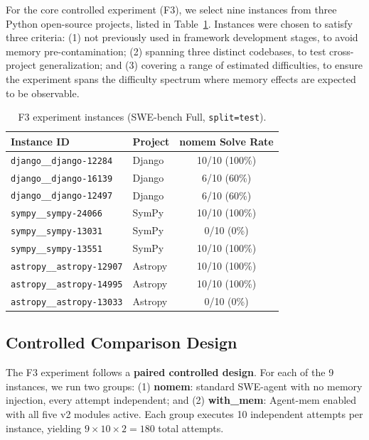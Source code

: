 \documentclass{article}
\begin{document}
For the core controlled experiment (F3), we select nine instances from three Python open-source projects, listed in Table~\ref{tab:instances}. Instances were chosen to satisfy three criteria: (1) not previously used in framework development stages, to avoid memory pre-contamination; (2) spanning three distinct codebases, to test cross-project generalization; and (3) covering a range of estimated difficulties, to ensure the experiment spans the difficulty spectrum where memory effects are expected to be observable.

\begin{table}[h]
\centering
\caption{F3 experiment instances (SWE-bench Full, \texttt{split=test}).}
\label{tab:instances}
\begin{tabular}{llc}
\toprule
\textbf{Instance ID} & \textbf{Project} & \textbf{nomem Solve Rate} \\
\midrule
\texttt{django\_\_django-12284} & Django & 10/10 (100\%) \\
\texttt{django\_\_django-16139} & Django & 6/10 (60\%) \\
\texttt{django\_\_django-12497} & Django & 6/10 (60\%) \\
\texttt{sympy\_\_sympy-24066} & SymPy & 10/10 (100\%) \\
\texttt{sympy\_\_sympy-13031} & SymPy & 0/10 (0\%) \\
\texttt{sympy\_\_sympy-13551} & SymPy & 10/10 (100\%) \\
\texttt{astropy\_\_astropy-12907} & Astropy & 10/10 (100\%) \\
\texttt{astropy\_\_astropy-14995} & Astropy & 10/10 (100\%) \\
\texttt{astropy\_\_astropy-13033} & Astropy & 0/10 (0\%) \\
\bottomrule
\end{tabular}
\end{table}

\subsection{Controlled Comparison Design}

The F3 experiment follows a \textbf{paired controlled design}. For each of the 9 instances, we run two groups: (1) \textbf{nomem}: standard SWE-agent with no memory injection, every attempt independent; and (2) \textbf{with\_mem}: Agent-mem enabled with all five v2 modules active. Each group executes 10 independent attempts per instance, yielding $9 \times 10 \times 2 = 180$ total attempts.
\end{document}
